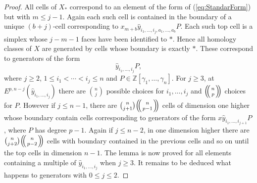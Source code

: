 \documentclass{article}
\theoremstyle{plain}
\theoremstyle{definition}
\numberwithin{thm}{section}
\begin{document}
\begin{proof}
					All cells of $X_*$ correspond to an element of the form of (\ref{eq:StandarForm}) but with $m\leq j-1$.
					Again each such cell is contained in the boundary of a unique $(b+j)$-cell corresponding to $x_{m+b}\hat{y}_{i_1,\dots,i_j,a_1,\dots,a_b}P$.
					Each such top cell is a simplex whose $j-m-1$ faces have been identified to $*$.
					Hence all homology classes of $X$ are generated by cells whose boundary is exactly $*$.
					These correspond to generators of the form
					\begin{equation*}
						\hat{y}_{i_1,\dots,i_j}P,
					\end{equation*}
					where $j\geq 2$, $1\leq i_1<\cdots<i_j\leq n$ and $P\in \mathbb{Z}[\gamma_1,\dots,\gamma_n]$.
					For $j\geq 3$, at $E^{p,n-j}(\hat{y}_{i_1,\dots,i_j})$ there are $\binom{n}{j}$ possible choices for $i_1,\dots,i_j$ and ${\ensuremath{\left(\kern-.3em\left(\genfrac{}{}{0pt}{}{{n}}{{p}}\right)\kern-.3em\right)}}$ choices for $P$.
					However if $j\leq n-1$, there are $\binom{n}{j+1}{\ensuremath{\left(\kern-.3em\left(\genfrac{}{}{0pt}{}{{n}}{{p-1}}\right)\kern-.3em\right)}}$
					cells of dimension one higher whose boundary contain cells corresponding to generators of the form 
					$x\hat{y}_{i_1,\dots,i_{j+1}}P$, where $P$ has degree $p-1$.
					Again if $j\leq n-2$, in one dimension higher there are $\binom{n}{j+2}{\ensuremath{\left(\kern-.3em\left(\genfrac{}{}{0pt}{}{{n}}{{p-2}}\right)\kern-.3em\right)}}$ cells with boundary contained in the previous cells
					and so on until the top cells in dimension $n-1$.
					The lemma is now proved for all elements containing a multiple of $\hat{y}_{i_1,\dots,i_j}$ when $j\geq 3$.
					It remains to be deduced what happens to generators with $0\leq j\leq 2$.
					

\end{proof}
\end{document}
